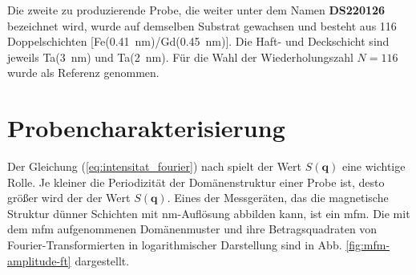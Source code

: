 \noindent
Die zweite zu produzierende Probe, die weiter unter dem Namen \textbf{DS220126} bezeichnet wird, wurde auf demselben Substrat gewachsen und besteht aus 116 Doppelschichten [Fe(\SI{0.41}{\nano\meter})/Gd(\SI{0.45}{\nano\meter})]. Die Haft- und Deckschicht sind jeweils Ta(\SI{3}{\nano\meter}) und Ta(\SI{2}{\nano\meter}). Für die Wahl der Wiederholungszahl $N=116$ wurde \cite[Abschnitt „Sample Preparation“]{tripathi_dichroic_2011} als Referenz genommen.

\section{Probencharakterisierung}
Der Gleichung (\ref{eq:intensitat_fourier}) nach spielt der Wert $S(\mathbf{q})$ eine wichtige Rolle. Je kleiner die Periodizität der Domänenstruktur einer Probe ist, desto größer wird der der Wert $S(\mathbf{q})$. Eines der Messgeräten, das die magnetische Struktur dünner Schichten mit \si{\nano\meter}-Auflösung abbilden kann, ist ein \gls{mfm}. Die mit dem \gls{mfm} aufgenommenen Domänenmuster und ihre Betragsquadraten von Fourier-Transformierten in logarithmischer Darstellung sind in Abb. \ref{fig:mfm-amplitude-ft} dargestellt.
